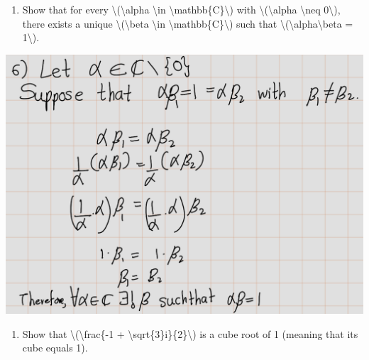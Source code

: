 \documentclass[
]{book}
\providecommand{\tightlist}{%
  \setlength{\itemsep}{0pt}\setlength{\parskip}{0pt}}
\theoremstyle{definition}
\theoremstyle{definition}
\theoremstyle{definition}
\theoremstyle{definition}
\theoremstyle{remark}
\begin{document}
\begin{enumerate}
\def\labelenumi{\arabic{enumi}.}
\setcounter{enumi}{5}
\tightlist
\item
  Show that for every \textbackslash(\textbackslash alpha \textbackslash in \textbackslash mathbb\{C\}\textbackslash) with \textbackslash(\textbackslash alpha \textbackslash neq 0\textbackslash), there exists a unique \textbackslash(\textbackslash beta \textbackslash in \textbackslash mathbb\{C\}\textbackslash) such that \textbackslash(\textbackslash alpha\textbackslash beta = 1\textbackslash).
\end{enumerate}

\includegraphics{fig/Ex1A/Ex6.png}

\begin{enumerate}
\def\labelenumi{\arabic{enumi}.}
\setcounter{enumi}{6}
\tightlist
\item
  Show that \textbackslash(\textbackslash frac\{-1 + \textbackslash sqrt\{3\}i\}\{2\}\textbackslash) is a cube root of 1 (meaning that its cube equals 1).
\end{enumerate}
\end{document}
